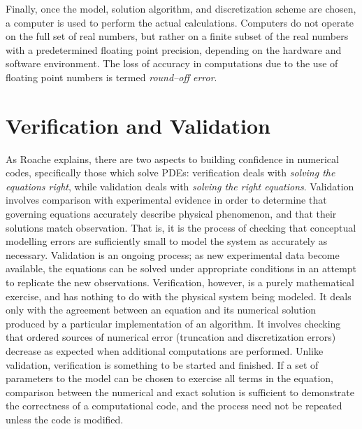 \documentclass[ms,cpyr,lof,lot]{uathesis}
\begin{document}
Finally, once the model, solution algorithm, and discretization scheme are chosen, a computer is used to perform the actual calculations.
Computers do not operate on the full set of real numbers, but rather on a finite subset of the real numbers with a predetermined floating point precision, depending on the hardware and software environment.
The loss of accuracy in computations due to the use of floating point numbers is termed \textit{round--off error}.


\section{Verification and Validation}
\label{sec:v2}
As Roache explains, there are two aspects to building confidence in numerical codes, specifically those which solve PDEs:
verification deals with \textit{solving the equations right}, while validation deals with \textit{solving the right equations}.
Validation involves comparison with experimental evidence in order to determine that governing equations
accurately describe physical phenomenon, and that their solutions match observation.
That is, it is the process of checking that conceptual modelling errors are sufficiently small to model the system as accurately as necessary.
Validation is an ongoing process; as new experimental data become available, the equations can be solved under appropriate conditions in an attempt to replicate the new observations.
Verification, however, is a purely mathematical exercise, and has nothing to do with the physical system being modeled.
It deals only with the agreement between an equation and its numerical solution produced by a particular implementation of an algorithm.
It involves checking that ordered sources of numerical error (truncation and discretization errors) decrease as expected when additional computations are performed.
Unlike validation, verification is something to be started and finished.
If a set of parameters to the model can be chosen to exercise all terms in the equation, comparison between the numerical and exact solution is sufficient to demonstrate the correctness of a computational code, and the process need not be repeated unless the code is modified.
\end{document}
